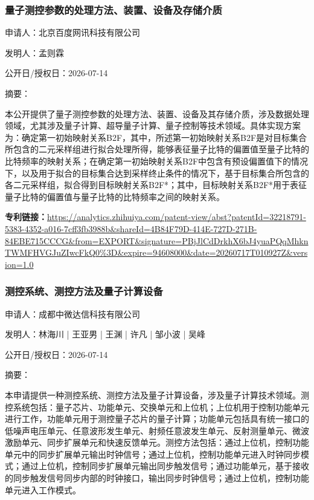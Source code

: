 \documentclass[12pt,a4paper]{ctexart}
\begin{document}
\subsubsection{ 量子测控参数的处理方法、装置、设备及存储介质 }

申请人：北京百度网讯科技有限公司

发明人：孟则霖

公开日/授权日：2026-07-14

摘要：

本公开提供了量子测控参数的处理方法、装置、设备及其存储介质，涉及数据处理领域，尤其涉及量子计算、超导量子计算、量子控制等技术领域。具体实现方案为：确定第一初始映射关系B2F，其中，所述第一初始映射关系B2F是对目标集合所包含的二元采样组进行拟合处理所得，能够表征量子比特的偏置值至量子比特的比特频率的映射关系；在确定第一初始映射关系B2F中包含有预设偏置值下的情况下，以及用于拟合的目标集合达到采样终止条件的情况下，基于目标集合所包含的各二元采样组，拟合得到目标映射关系B2F*；其中，目标映射关系B2F*用于表征量子比特的偏置值与量子比特的比特频率之间的映射关系。

\noindent\textbf{专利链接：}\url{https://analytics.zhihuiya.com/patent-view/abst?patentId=32218791-5383-4352-a016-7cff3fb3988b&shareId=4B84F79D-414E-727D-271B-84EBE715CCCG&from=EXPORT&signature=PBjJlCdDrkhX6bJ4yuaPQqMhknTWMFHVGJuZIwcFkQ0%3D&expire=94608000&date=20260717T010927Z&version=1.0}

\subsubsection{ 测控系统、测控方法及量子计算设备 }

申请人：成都中微达信科技有限公司

发明人：林海川 | 王亚男 | 王渊 | 许凡 | 邹小波 | 吴峰

公开日/授权日：2026-07-14

摘要：

本申请提供一种测控系统、测控方法及量子计算设备，涉及量子计算技术领域。测控系统包括：量子芯片、功能单元、交换单元和上位机；上位机用于控制功能单元进行工作，功能单元用于测控量子芯片的量子计算；功能单元包括具有统一接口的低噪声电压单元、任意波形发生单元、射频任意波发生单元、反射测量单元、微波激励单元、同步扩展单元和快速反馈单元。测控方法包括：通过上位机，控制功能单元中的同步扩展单元输出时钟信号；通过上位机，控制功能单元进入时钟同步模式；通过上位机，控制同步扩展单元输出同步触发信号；通过功能单元，基于接收的同步触发信号同步内部的时钟接口，输出同步时钟信号；通过上位机，控制功能单元进入工作模式。
\end{document}
